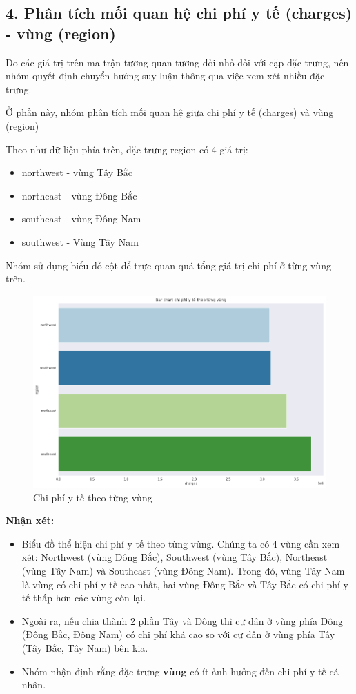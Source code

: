 \documentclass{article}
\begin{document}
	\subsection{4. Phân tích mối quan hệ chi phí y tế (charges) - vùng (region)}
	\qquad Do các giá trị trên ma trận tương quan tương đối nhỏ đối với cặp đặc trưng, nên nhóm quyết định chuyển hướng suy luận thông qua việc xem xét nhiều đặc trưng.
	
	Ở phần này, nhóm phân tích mối quan hệ giữa chi phí y tế (charges) và vùng (region)
	
	Theo như dữ liệu phía trên, đặc trưng region có 4 giá trị:
	\begin{itemize}
		\item northwest - vùng Tây Bắc
		\item northeast - vùng Đông Bắc
		\item southeast - vùng Đông Nam
		\item southwest - Vùng Tây Nam
	\end{itemize}
	Nhóm sử dụng biểu đồ cột để trực quan quá tổng giá trị chi phí ở từng vùng trên.
	\begin{figure}[H]
		\centering
		\includegraphics[width=1\textwidth]{images/bar_chart_medical_charges_region.png}
		\caption{Chi phí y tế theo từng vùng}
		\label{fig:writing-thesis-bar-chart-medical-charges-region}
	\end{figure}
	\textbf{Nhận xét:} 
	\begin{itemize}
		\item 	Biểu đồ thể hiện chi phí y tế theo từng vùng. Chúng ta có 4 vùng cần xem xét: Northwest (vùng Đông Bắc), Southwest (vùng Tây Bắc), Northeast (vùng Tây Nam) và Southeast (vùng Đông Nam). Trong đó, vùng Tây Nam là vùng có chi phí y tế cao nhất, hai vùng Đông Bắc và Tây Bắc có chi phí y tế thấp hơn các vùng còn lại.
		\item Ngoài ra, nếu chia thành 2 phần Tây và Đông thì cư dân ở vùng phía Đông (Đông Bắc, Đông Nam) có chi phí khá cao so với cư dân ở vùng phía Tây (Tây Bắc, Tây Nam) bên kia.
		\item Nhóm nhận định rằng đặc trưng \textbf{vùng} có ít ảnh hưởng đến chi phí y tế cá nhân.
	\end{itemize}
\end{document}
